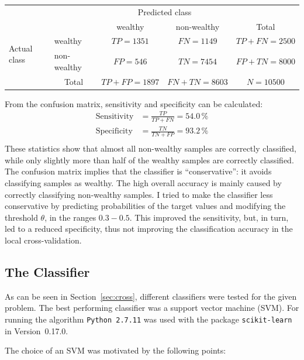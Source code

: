 \documentclass[a4paper]{article}
\begin{document}
\begin{table}[h]
\centering
\begin{tabular}{l|l|c|c|c}
\multicolumn{2}{c}{}&\multicolumn{2}{c}{Predicted class}&\\
\cline{3-4}
\multicolumn{2}{c|}{}&wealthy & non-wealthy &\multicolumn{1}{c}{Total}\\
\cline{2-4}
\multirow{2}{*}{Actual class}& wealthy & $TP = 1351$ & $FN = 1149$ & $TP+FN = 2500$\\
\cline{2-4}
& non-wealthy & $FP = 546$ & $TN = 7454$ & $FP+TN = 8000$\\
\cline{2-4}
\multicolumn{1}{c}{} & \multicolumn{1}{c}{Total} & \multicolumn{1}{c}{$TP+FP=1897$} & \multicolumn{1}{c}{$FN+TN = 8603$} & \multicolumn{1}{c}{$N = 10500$}\\
\end{tabular}
\end{table}
From the confusion matrix, sensitivity and specificity can be calculated:
\begin{align}
\text{Sensitivity} &= \frac{TP}{TP + FN} = 54.0\,\%\\
\text{Specificity}    &= \frac{TN}{TN + FP} = 93.2\,\%\\
\end{align}
These statistics show that almost all non-wealthy samples are
correctly classified, while only slightly more than half of the
wealthy samples are correctly classified. The confusion matrix implies
that the classifier is ``conservative'': it avoids classifying samples
as wealthy. The high overall accuracy is mainly caused by correctly
classifying non-wealthy samples. I tried to make the classifier less
conservative by predicting probabilities of the target values and
modifying the threshold $\theta$, in the ranges $0.3 - 0.5$. This
improved the sensitivity, but, in turn, led to a reduced specificity,
thus not improving the classification accuracy in the local
cross-validation.

\subsection{The Classifier}

As can be seen in Section~\ref{sec:cross}, different classifiers were
tested for the given problem. The best performing classifier was a support
vector machine (SVM). For running the algorithm \texttt{Python~2.7.11}
was used with the package \texttt{scikit-learn} in Version~0.17.0.

The choice of an SVM was motivated by the following points:
\end{document}
